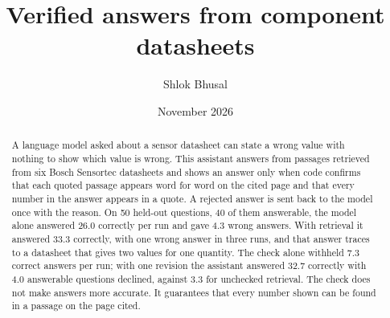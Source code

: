 \documentclass[11pt]{article}
\title{Verified answers from component datasheets}
\author{Shlok Bhusal}
\date{November 2026}
\begin{document}
\maketitle

\begin{abstract}
A language model asked about a sensor datasheet can state a wrong value with nothing to show which value is wrong. This assistant answers from passages retrieved from six Bosch Sensortec datasheets and shows an answer only when code confirms that each quoted passage appears word for word on the cited page and that every number in the answer appears in a quote. A rejected answer is sent back to the model once with the reason. On 50 held-out questions, 40 of them answerable, the model alone answered 26.0 correctly per run and gave 4.3 wrong answers. With retrieval it answered 33.3 correctly, with one wrong answer in three runs, and that answer traces to a datasheet that gives two values for one quantity. The check alone withheld 7.3 correct answers per run; with one revision the assistant answered 32.7 correctly with 4.0 answerable questions declined, against 3.3 for unchecked retrieval. The check does not make answers more accurate. It guarantees that every number shown can be found in a passage on the page cited.
\end{abstract}











\appendix

\end{document}
